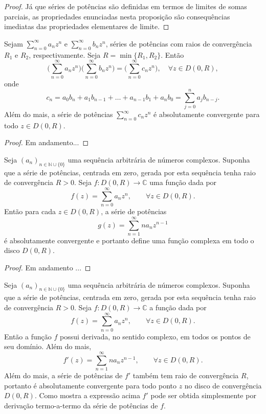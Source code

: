 \begin{proof}
Já que séries de potências são definidas em termos de limites de somas parciais, 
as propriedades enunciadas nesta proposição 
são consequências imediatas das propriedades elementares de limite.
\end{proof}



\begin{proposicao}
Sejam $\sum_{n=0}^{\infty}a_nz^n$ e $\sum_{n=0}^{\infty}b_nz^n$,
séries de potências com raios de convergência $R_1$ e $R_2$, respectivamente.
Seja $R=\min\{R_1,R_2\}$. Então 
\[
\Big(\sum_{n=0}^{\infty}a_nz^n\Big)\Big(\sum_{n=0}^{\infty}b_nz^n\Big)
=
\Big(\sum_{n=0}^{\infty}c_nz^n\Big),
\quad \forall z\in D(0,R),
\]
onde 
\[
c_n = a_0b_n+a_1b_{n-1}+\ldots+a_{n-1}b_{1}+a_{n}b_0 = \sum_{j=0}^n a_{j}b_{n-j}.
\]
Além do mais, a série de potências $\sum_{n=0}^{\infty}c_nz^n$ é absolutamente convergente
para todo $z\in D(0,R)$.
\end{proposicao}

\begin{proof}
{\red Em andamento...}
\end{proof}



\begin{proposicao}
Seja $(a_n)_{n\in\mathbb{N}\cup\{0\}}$ uma sequência arbitrária de números complexos.
Suponha que a série de potências, centrada em zero, gerada por esta sequência tenha raio de convergência $R>0$. 
Seja $f:D(0,R)\to\mathbb{C}$ uma função dada por
\[
f(z) = \sum_{n=0}^{\infty}a_nz^n, \qquad \forall z\in D(0,R).
\]
Então para cada $z\in D(0,R)$, a série de potências
\[
g(z) = \sum_{n=1}^{\infty}na_nz^{n-1}
\] 
é absolutamente convergente e portanto
define uma função complexa em todo o disco $D(0,R)$.
\end{proposicao}

\begin{proof}
{\red Em andamento ...}
\end{proof}

\begin{teorema}
Seja $(a_n)_{n\in\mathbb{N}\cup\{0\}}$ uma sequência arbitrária de números complexos.
Suponha que a série de potências, centrada em zero, gerada por esta sequência tenha raio de convergência $R>0$. 
Seja $f:D(0,R)\to\mathbb{C}$ a função dada por
\[
f(z) = \sum_{n=0}^{\infty}a_nz^n, \qquad \forall z\in D(0,R).
\]
Então a função $f$ possui derivada, no sentido complexo, em todos os 
pontos de seu domínio. Além do mais, 
\[
f'(z) = \sum_{n=1}^{\infty}na_nz^{n-1}, \qquad\forall z\in D(0,R).
\]
Além do mais, a série de potências de $f'$ também tem raio de convergência $R$,
portanto é absolutamente convergente para todo ponto $z$ no 
disco de convergência $D(0,R)$. Como mostra a expressão acima 
$f'$ pode ser obtida simplesmente 
por derivação termo-a-termo da série de potências de $f$.
\end{teorema}

